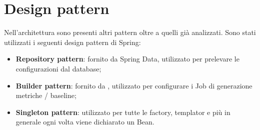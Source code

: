 \section{Design pattern} \label{pattern}

    Nell'architettura sono presenti altri pattern oltre a quelli già analizzati.
    Sono stati utilizzati i seguenti design pattern di Spring:

    \begin{itemize}
        \item \textbf{Repository pattern}: fornito da Spring Data, utilizzato per prelevare le configurazioni dal database;
        \item \textbf{Builder pattern}: fornito da , utilizzato per configurare i Job di
        generazione metriche / baseline;
        \item \textbf{Singleton pattern}: utilizzato per tutte le factory, templator e più in generale ogni volta
        viene dichiarato un Bean.
    \end{itemize}